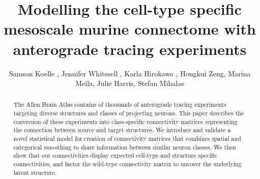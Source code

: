 \documentclass[NETN,manuscript]{stjour-new}
\begin{document}



\title{Modelling the cell-type specific mesoscale murine connectome with anterograde tracing experiments}

\author[Koelle et al]%
{Samson Koelle , Jennifer Whitesell , Karla Hirokawa ,  Hongkui Zeng, Marina Meila, Julie Harris, Stefan Mihalas}





\begin{abstract}
The Allen Brain Atlas contains of thousands of anterograde tracing experiments targeting diverse structures and classes of projecting neurons.
This paper describes the conversion of these experiments into class-specific connectivity matrices representing the connection between source and target structures.
We introduce and validate a novel statistical model for creation of connectivity matrices that combines spatial and categorical smoothing to share information between similar neuron classes.
We then show that our connectivities display expected cell-type and structure specific connectivities, and factor the wild-type connectivity matrix to uncover the underlying latent structure. 
\end{abstract}

\begin{authorsummary}

\end{authorsummary}

\newpage


\newpage

\newpage

\newpage

\end{document}
